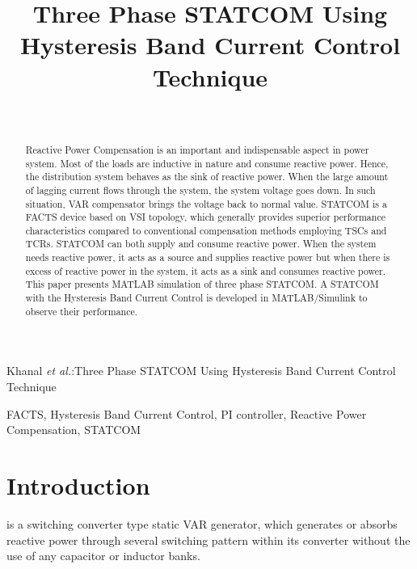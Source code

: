 \documentclass[journal,twoside]{IEEEtran}
\begin{document}
    \setcounter{page}{42}
    \title{Three Phase STATCOM Using Hysteresis Band Current Control Technique}
    \author{\\
    }


%
{Khanal \MakeLowercase{\textit{et al.}}:Three Phase STATCOM Using Hysteresis Band Current Control Technique}

    \maketitle
	\begin{abstract}
Reactive Power Compensation is an
important and indispensable aspect in power system. Most of the loads
are inductive in nature and consume reactive
power. Hence, the distribution system behaves
as the sink of reactive power. When the large
amount of lagging current flows through the
system, the system voltage goes down. In such
situation, VAR compensator brings the voltage
back to normal value. STATCOM is a FACTS
device based on VSI topology, which generally
provides superior performance characteristics
compared
to
conventional
compensation methods employing TSCs and
TCRs. STATCOM can both supply and consume
reactive power. When the system needs
reactive power, it acts as a source and supplies
reactive power but when there is excess of
reactive power in the system, it acts as a sink
and consumes reactive power. This paper
presents MATLAB simulation of three phase
STATCOM. A STATCOM with the Hysteresis
Band Current Control is developed in
MATLAB/Simulink
to
observe
their
performance.
	\end{abstract}
	\begin{IEEEkeywords}
FACTS, Hysteresis Band
Current Control, PI controller, Reactive Power Compensation, STATCOM

	\end{IEEEkeywords}
	\section{Introduction}
 is a switching converter type static
VAR generator, which generates or absorbs
reactive power through several switching pattern
within its converter without the use of any capacitor or
inductor banks.
\end{document}
